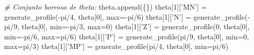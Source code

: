 \documentclass[onecolumn]{article}
\newenvironment{Shaded}{}{}
\newcommand{\BuiltInTok}[1]{#1}
\newcommand{\CommentTok}[1]{\textcolor[rgb]{0.38,0.63,0.69}{\textit{#1}}}
\newcommand{\DecValTok}[1]{\textcolor[rgb]{0.25,0.63,0.44}{#1}}
\newcommand{\NormalTok}[1]{#1}
\newcommand{\OperatorTok}[1]{\textcolor[rgb]{0.40,0.40,0.40}{#1}}
\newcommand{\StringTok}[1]{\textcolor[rgb]{0.25,0.44,0.63}{#1}}
\begin{document}
\begin{Shaded}
\begin{Highlighting}[]
\CommentTok{# Conjunto borroso de theta:}
\NormalTok{theta.append(\{\})}
\NormalTok{theta[}\DecValTok{1}\NormalTok{][}\StringTok{'MN'}\NormalTok{] }\OperatorTok{=}\NormalTok{ generate_profile(}\OperatorTok{-}\NormalTok{pi}\OperatorTok{/}\DecValTok{4}\NormalTok{, theta[}\DecValTok{0}\NormalTok{], }\BuiltInTok{max}\OperatorTok{=-}\NormalTok{pi}\OperatorTok{/}\DecValTok{6}\NormalTok{)}
\NormalTok{theta[}\DecValTok{1}\NormalTok{][}\StringTok{'N'}\NormalTok{] }\OperatorTok{=}\NormalTok{ generate_profile(}\OperatorTok{-}\NormalTok{pi}\OperatorTok{/}\DecValTok{9}\NormalTok{, theta[}\DecValTok{0}\NormalTok{], }\BuiltInTok{min}\OperatorTok{=-}\NormalTok{pi}\OperatorTok{/}\DecValTok{3}\NormalTok{, }\BuiltInTok{max}\OperatorTok{=}\DecValTok{0}\NormalTok{)}
\NormalTok{theta[}\DecValTok{1}\NormalTok{][}\StringTok{'Z'}\NormalTok{] }\OperatorTok{=}\NormalTok{ generate_profile(}\DecValTok{0}\NormalTok{, theta[}\DecValTok{0}\NormalTok{], }\BuiltInTok{min}\OperatorTok{=-}\NormalTok{pi}\OperatorTok{/}\DecValTok{6}\NormalTok{, }\BuiltInTok{max}\OperatorTok{=}\NormalTok{pi}\OperatorTok{/}\DecValTok{6}\NormalTok{)}
\NormalTok{theta[}\DecValTok{1}\NormalTok{][}\StringTok{'P'}\NormalTok{] }\OperatorTok{=}\NormalTok{ generate_profile(pi}\OperatorTok{/}\DecValTok{9}\NormalTok{, theta[}\DecValTok{0}\NormalTok{], }\BuiltInTok{min}\OperatorTok{=}\DecValTok{0}\NormalTok{, }\BuiltInTok{max}\OperatorTok{=}\NormalTok{pi}\OperatorTok{/}\DecValTok{3}\NormalTok{)}
\NormalTok{theta[}\DecValTok{1}\NormalTok{][}\StringTok{'MP'}\NormalTok{] }\OperatorTok{=}\NormalTok{ generate_profile(pi}\OperatorTok{/}\DecValTok{4}\NormalTok{, theta[}\DecValTok{0}\NormalTok{], }\BuiltInTok{min}\OperatorTok{=}\NormalTok{pi}\OperatorTok{/}\DecValTok{6}\NormalTok{)}


\end{Highlighting}
\end{Shaded}
\end{document}
